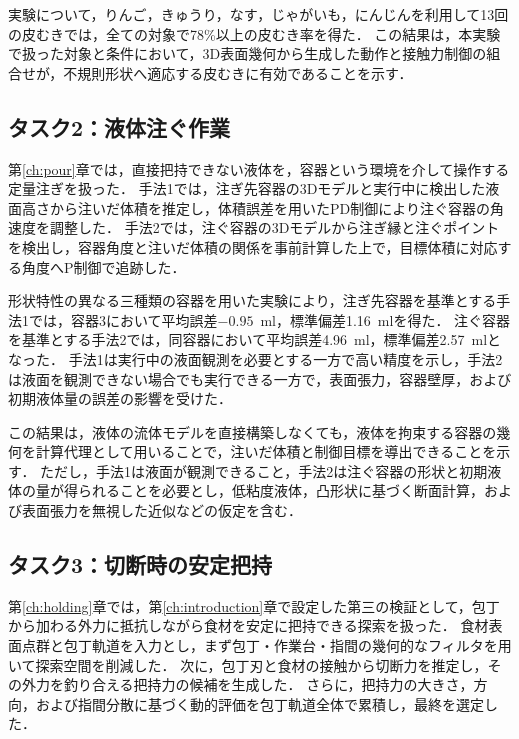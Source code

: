 実験について，りんご，きゅうり，なす，じゃがいも，にんじんを利用して13回の皮むきでは，全ての対象で78\%以上の皮むき率を得た．
この結果は，本実験で扱った対象と条件において，3D表面幾何から生成した動作と接触力制御の組合せが，不規則形状へ適応する皮むきに有効であることを示す．

\subsection{タスク2：液体注ぐ作業}
\label{subsec:conclusion_pouring}

第\ref{ch:pour}章では，直接把持できない液体を，容器という環境を介して操作する定量注ぎを扱った．
手法1では，注ぎ先容器の3Dモデルと実行中に検出した液面高さから注いだ体積を推定し，体積誤差を用いたPD制御により注ぐ容器の角速度を調整した．
手法2では，注ぐ容器の3Dモデルから注ぎ縁と注ぐポイントを検出し，容器角度と注いだ体積の関係を事前計算した上で，目標体積に対応する角度へP制御で追跡した．

形状特性の異なる三種類の容器を用いた実験により，注ぎ先容器を基準とする手法1では，容器3において平均誤差$-0.95$~ml，標準偏差1.16~mlを得た．
注ぐ容器を基準とする手法2では，同容器において平均誤差4.96~ml，標準偏差2.57~mlとなった．
手法1は実行中の液面観測を必要とする一方で高い精度を示し，手法2は液面を観測できない場合でも実行できる一方で，表面張力，容器壁厚，および初期液体量の誤差の影響を受けた．

この結果は，液体の流体モデルを直接構築しなくても，液体を拘束する容器の幾何を計算代理として用いることで，注いだ体積と制御目標を導出できることを示す．
ただし，手法1は液面が観測できること，手法2は注ぐ容器の形状と初期液体の量が得られることを必要とし，低粘度液体，凸形状に基づく断面計算，および表面張力を無視した近似などの仮定を含む．

\subsection{タスク3：切断時の安定把持}
\label{subsec:conclusion_holding}

第\ref{ch:holding}章では，第\ref{ch:introduction}章で設定した第三の検証として，包丁から加わる外力に抵抗しながら食材を安定に把持できる{\nameholdingpointset}探索を扱った．
食材表面点群と包丁軌道を入力とし，まず包丁・作業台・指間の幾何的なフィルタを用いて探索空間を削減した．
次に，包丁刃と食材の接触から切断力を推定し，その外力を釣り合える把持力の候補を生成した．
さらに，把持力の大きさ，方向，および指間分散に基づく動的評価を包丁軌道全体で累積し，最終{\nameholdingpointset}を選定した．

